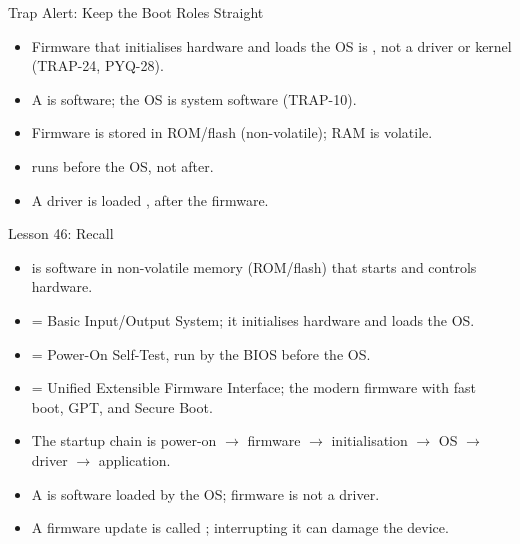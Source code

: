 \documentclass[aspectratio=169]{beamer}
\begin{document}
\begin{frame}{Trap Alert: Keep the Boot Roles Straight}
  \begin{itemize}
    \item Firmware that initialises hardware and loads the OS is
      , not a driver or kernel (TRAP-24, PYQ-28).
    \item A  is software; the OS is system software
      (TRAP-10).
    \item Firmware is stored in ROM/flash (non-volatile); RAM is volatile.
    \item {} runs before the OS, not after.
    \item A driver is loaded , after the firmware.
  \end{itemize}
\end{frame}

\begin{frame}{Lesson 46: Recall}
  \begin{itemize}
    \item {} is software in non-volatile memory (ROM/flash) that
      starts and controls hardware.
    \item {} = Basic Input/Output System; it initialises hardware and
      loads the OS.
    \item {} = Power-On Self-Test, run by the BIOS before the OS.
    \item {} = Unified Extensible Firmware Interface; the modern
      firmware with fast boot, GPT, and Secure Boot.
    \item The startup chain is power-on $\rightarrow$ firmware
      $\rightarrow$ initialisation $\rightarrow$ OS $\rightarrow$ driver
      $\rightarrow$ application.
    \item A  is software loaded by the OS; firmware is not
      a driver.
    \item A firmware update is called ; interrupting it can
      damage the device.
  \end{itemize}
\end{frame}
\end{document}
